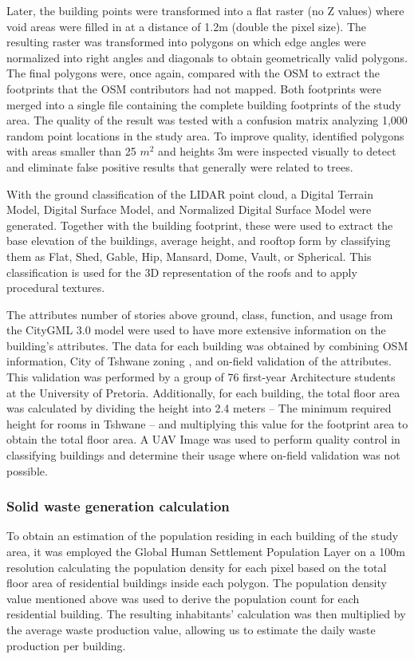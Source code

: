 \documentclass[authoryear,preprint,review,12pt]{elsarticle}
\begin{document}
    Later, the building points were transformed into a flat raster (no Z values) where void areas were filled in at a distance of 1.2m (double the pixel size). The resulting raster was transformed into polygons on which edge angles were normalized into right angles and diagonals to obtain geometrically valid polygons. The final polygons were, once again, compared with the OSM to extract the footprints that the OSM contributors had not mapped. Both footprints were merged into a single file containing the complete building footprints of the study area. The quality of the result was tested with a confusion matrix analyzing 1,000 random point locations in the study area. To improve quality, identified polygons with areas smaller than 25 $m^2$ and heights \> 3m were inspected visually to detect and eliminate false positive results that generally were related to trees.

    With the ground classification of the LIDAR point cloud, a Digital Terrain Model, Digital Surface Model, and Normalized Digital Surface Model were generated. Together with the building footprint, these were used to extract the base elevation of the buildings, average height, and rooftop form by classifying them as Flat, Shed, Gable, Hip, Mansard, Dome, Vault, or Spherical. This classification is used for the 3D representation of the roofs and to apply procedural textures.

    The attributes number of stories above ground, class, function, and usage from the CityGML 3.0 model were used to have more extensive information on the building's attributes. The data for each building was obtained by combining OSM information, City of Tshwane zoning \citep{tshwaneGeographicInformationSystem2023}, and on-field validation of the attributes. This validation was performed by a group of 76 first-year Architecture students at the University of Pretoria. Additionally, for each building, the total floor area was calculated by dividing the height into 2.4 meters – The minimum required height for rooms in Tshwane \citep{tshwaneTshwaneTownplanningScheme2014} – and multiplying this value for the footprint area to obtain the total floor area. A UAV Image was used to perform quality control in classifying buildings and determine their usage where on-field validation was not possible.

    \subsubsection{Solid waste generation calculation} \label{subsubsec:Generation}
    To obtain an estimation of the population residing in each building of the study area, it was employed the Global Human Settlement Population Layer \citep{Schiavina2022} on a 100m resolution calculating the population density for each pixel based on the total floor area of residential buildings inside each polygon. The population density value mentioned above was used to derive the population count for each residential building. The resulting inhabitants’ calculation was then multiplied by the average waste production value, allowing us to estimate the daily waste production per building.
\end{document}
